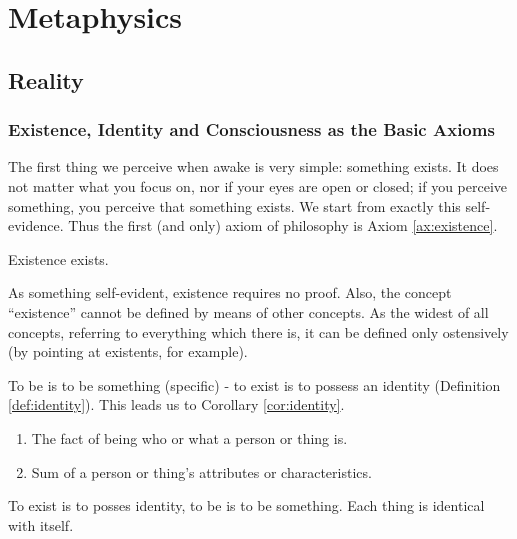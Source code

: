\part{Metaphysics}
\label{part:metaphysics}

\chapter{Reality}

    \section{Existence, Identity and Consciousness as the Basic Axioms}

        The first thing we perceive when awake is very simple: something exists. It does not matter what you focus on, nor if your eyes are open or closed; if you perceive something, you perceive that something exists. We start from exactly this self-evidence. Thus the first (and only) axiom of philosophy is Axiom \ref{ax:existence}.
    
            \begin{axiom}[Existence]
            \label{ax:existence}
                Existence exists.
            \end{axiom}
            
        As something self-evident, existence requires no proof. Also, the concept ``existence'' cannot be defined by means of other concepts. As the widest of all concepts, referring to everything which there is, it can be defined only ostensively (by pointing at existents, for example).

        To be is to be something (specific) - to exist is to possess an identity (Definition \ref{def:identity}). This leads us to Corollary \ref{cor:identity}.
            
            \begin{definition}[Identity]
            \label{def:identity}
                \begin{enumerate}
                    \item The fact of being who or what a person or thing is.
                    \item Sum of a person or thing's attributes or characteristics.
                \end{enumerate}
            \end{definition}
        
            \begin{corollary}
            \label{cor:identity}
                To exist is to posses identity, to be is to be something. Each thing is identical with itself.
            \end{corollary}

